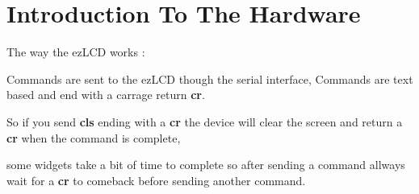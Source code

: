 \hypertarget{group__intro_hardware}{\section{Introduction To The Hardware}
\label{group__intro_hardware}
}
The way the ez\-L\-C\-D works \-:\par
 Commands are sent to the ez\-L\-C\-D though the serial interface, Commands are text based and end with a carrage return {\bfseries cr}.\par
 So if you send {\bfseries cls} ending with a {\bfseries cr} the device will clear the screen and return a {\bfseries cr} when the command is complete,\par
 some widgets take a bit of time to complete so after sending a command allways wait for a {\bfseries cr} to comeback before sending another command.\par
 